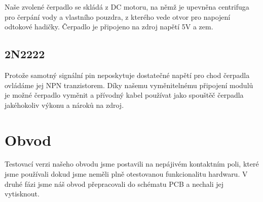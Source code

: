 \documentclass[11pt,a4paper]{article}
\begin{document}
Naše zvolené čerpadlo se skládá z DC motoru, na němž je upevněna centrifuga pro
čerpání vody a vlastního pouzdra, z kterého vede otvor pro napojení odtokové
hadičky. Čerpadlo je připojeno na zdroj napětí 5V a zem.

\subsection{2N2222}

Protože samotný signální pin neposkytuje dostatečné napětí pro chod čerpadla
ovládáme jej NPN tranzistorem. Díky našemu vyměnitelnému připojení modulů je
možné čerpadlo vyměnit a přívodný kabel používat jako spouštěč čerpadla
jakéhokoliv výkonu a nároků na zdroj.

\clearpage

\section{Obvod}

Testovací verzi našeho obvodu jsme postavili na nepájivém kontaktním poli,
které jsme používali dokud jsme neměli plně otestovanou funkcionalitu hardwaru.
V druhé fázi jsme náš obvod přepracovali do schématu PCB a nechali jej
vytisknout.
\end{document}
